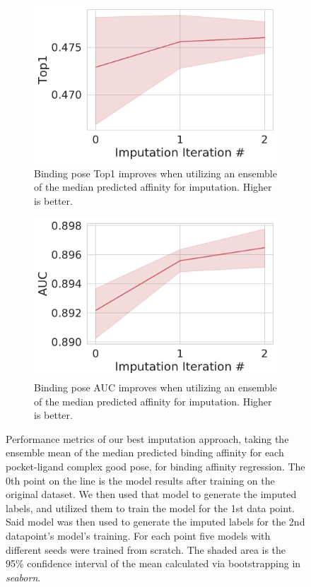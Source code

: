 \documentclass[journal=jcim,manuscript=article]{achemso}
\begin{document}
\begin{figure}[tbph]
    \begin{subfigure}[t]{0.48\textwidth}
        \centering
        \includegraphics[width=\linewidth]{figures/MedGOEnsTop1.pdf}
        \caption{Binding pose Top1 improves when utilizing an ensemble of the median predicted affinity for imputation. Higher is better.}
    \end{subfigure}
    \hfill
    \begin{subfigure}[t]{0.48\textwidth}
        \centering
        \includegraphics[width=\linewidth]{figures/MedGOEnsAUC.pdf}
        \caption{Binding pose AUC improves when utilizing an ensemble of the median predicted affinity for imputation. Higher is better.}
    \end{subfigure}
    \caption{Performance metrics of our best imputation approach, taking the ensemble mean of the median predicted binding affinity for each pocket-ligand complex good pose, for binding affinity regression. The 0th point on the line is the model results after training on the original dataset. We then used that model to generate the imputed labels, and utilized them to train the model for the 1st data point. Said model was then used to generate the imputed labels for the 2nd datapoint's model's training. For each point five models with different seeds were trained from scratch. The shaded area is the 95\% confidence interval of the mean calculated via bootstrapping in \textit{seaborn}.}
    \label{fig:medGOEnsOverall}
\end{figure}
\end{document}
